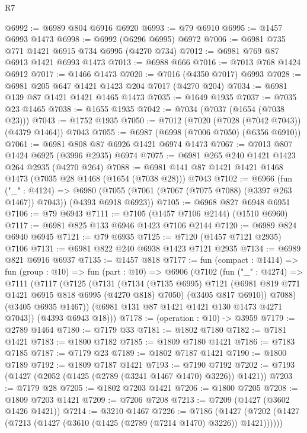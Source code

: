 \begin{lexlean}{R7}
\begin{coremodule}
@6992 := @6989 @804 @6916 @6920
@6993 := @79 @6910
@6995 := @1457 @6993 @1473
@6998 := @6992 (@6296 @6995) @6972
@7006 := @6981 @735 @771 @1421 @6915 @734 @6995 (@4270 @734)
@7012 := @6981 @769 @87 @6913 @1421 @6993 @1473
@7013 := @6988 @666
@7016 := @7013 @768 @1424 @6912
@7017 := @1466 @1473
@7020 := @7016 (@4350 @7017) @6993
@7028 := @6981 @205 @647 @1421 @1423 @204 @7017 (@4270 @204)
@7034 := @6981 @139 @87 @1421 @1421 @1465 @1473
@7035 := @1649 @1935
@7037 := @7035 @23 @1465
@7038 := @1655 @1935
@7042 := @7034 (@7037 (@1654 (@7038 @23)))
@7043 := @1752 @1935
@7050 := @7012 (@7020 (@7028 (@7042 @7043)) (@4379 @1464)) @7043
@7055 := @6987 (@6998 (@7006 @7050) (@6356 @6910))
@7061 := @6981 @808 @87 @6926 @1421 @6974 @1473
@7067 := @7013 @807 @1424 @6925 (@3996 @2935) @6974
@7075 := @6981 @265 @240 @1421 @1423 @264 @2935 (@4270 @264)
@7088 := @6981 @141 @87 @1421 @1421 @1468 @1473 (@7035 @28 @1468 (@1654 (@7038 @28))) @7043
@7102 := @6966
    (fun ("_" : @4124) =>
    @6980 (@7055 (@7061 (@7067 (@7075 @7088) (@3397 @263 @1467)) @7043)) (@4393 @6918 @6923))
@7105 := @6968 @827 @6948 @6951
@7106 := @79 @6943
@7111 := @7105 (@1457 @7106 @2144) (@1510 @6960)
@7117 := @6981 @825 @133 @6946 @1423 @7106 @2144
@7120 := @6989 @824 @6940 @6945
@7121 := @79 @6935
@7125 := @7120 (@1457 @7121 @2935) @7106
@7131 := @6981 @822 @240 @6938 @1423 @7121 @2935
@7134 := @6989 @821 @6916 @6937
@7135 := @1457 @818
@7177 := fun (compact : @1414) =>
  fun (group : @10) =>
  fun (part : @10) =>
  @6906
    (@7102
      (fun ("_" : @4274) =>
      @7111
        (@7117
          (@7125
            (@7131
              (@7134
                (@7135 @6995)
                @7121
                (@6981 @819 @771 @1421 @6915 @818 @6995 (@4270 @818) @7050)
                (@3405 @817 @6910))
              @7088)
            (@3405 @6935 @1467))
          (@6981 @131 @87 @1421 @1421 @130 @1473 @4271 @7043))
        (@4393 @6943 @18)))
@7178 := (operation : @10) -> @3959
@7179 := @2789 @1464
@7180 := @7179 @33
@7181 := @1802 @7180
@7182 := @7181 @1421
@7183 := @1800 @7182
@7185 := @1809 @7180 @1421
@7186 := @7183 @7185
@7187 := @7179 @23
@7189 := @1802 @7187 @1421
@7190 := @1800 @7189
@7192 := @1809 @7187 @1421
@7193 := @7190 @7192
@7202 := @7193 (@1427 (@2052 (@1425 (@2789 (@3241 @1467 @1470) @3226)) @1421))
@7203 := @7179 @28
@7205 := @1802 @7203 @1421
@7206 := @1800 @7205
@7208 := @1809 @7203 @1421
@7209 := @7206 @7208
@7213 := @7209 (@1427 (@3602 @1426 @1421))
@7214 := @3210 @1467
@7226 := @7186
    (@1427 (@7202 (@1427 (@7213 (@1427 (@3610 (@1425 (@2789 (@7214 @1470) @3226)) @1421))))))

\end{coremodule}
\end{lexlean}
